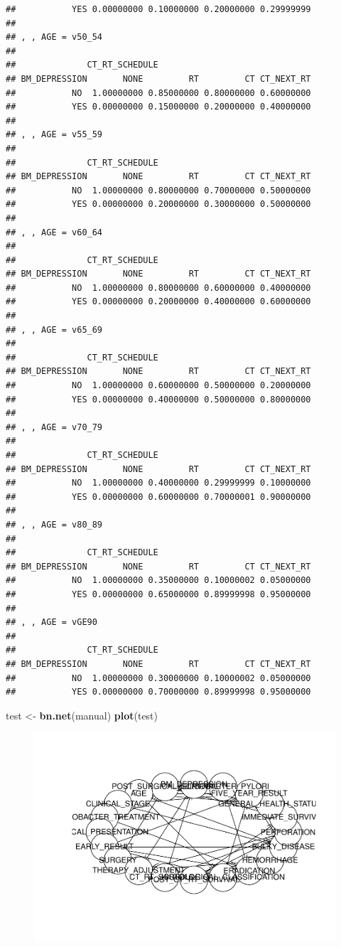 \documentclass[]{article}
\newenvironment{Shaded}{\begin{snugshade}}{\end{snugshade}}
\newcommand{\KeywordTok}[1]{\textcolor[rgb]{0.13,0.29,0.53}{\textbf{{#1}}}}
\newcommand{\StringTok}[1]{\textcolor[rgb]{0.31,0.60,0.02}{{#1}}}
\newcommand{\NormalTok}[1]{{#1}}
\begin{document}
\begin{verbatim}
##           YES 0.00000000 0.10000000 0.20000000 0.29999999
## 
## , , AGE = v50_54
## 
##              CT_RT_SCHEDULE
## BM_DEPRESSION       NONE         RT         CT CT_NEXT_RT
##           NO  1.00000000 0.85000000 0.80000000 0.60000000
##           YES 0.00000000 0.15000000 0.20000000 0.40000000
## 
## , , AGE = v55_59
## 
##              CT_RT_SCHEDULE
## BM_DEPRESSION       NONE         RT         CT CT_NEXT_RT
##           NO  1.00000000 0.80000000 0.70000000 0.50000000
##           YES 0.00000000 0.20000000 0.30000000 0.50000000
## 
## , , AGE = v60_64
## 
##              CT_RT_SCHEDULE
## BM_DEPRESSION       NONE         RT         CT CT_NEXT_RT
##           NO  1.00000000 0.80000000 0.60000000 0.40000000
##           YES 0.00000000 0.20000000 0.40000000 0.60000000
## 
## , , AGE = v65_69
## 
##              CT_RT_SCHEDULE
## BM_DEPRESSION       NONE         RT         CT CT_NEXT_RT
##           NO  1.00000000 0.60000000 0.50000000 0.20000000
##           YES 0.00000000 0.40000000 0.50000000 0.80000000
## 
## , , AGE = v70_79
## 
##              CT_RT_SCHEDULE
## BM_DEPRESSION       NONE         RT         CT CT_NEXT_RT
##           NO  1.00000000 0.40000000 0.29999999 0.10000000
##           YES 0.00000000 0.60000000 0.70000001 0.90000000
## 
## , , AGE = v80_89
## 
##              CT_RT_SCHEDULE
## BM_DEPRESSION       NONE         RT         CT CT_NEXT_RT
##           NO  1.00000000 0.35000000 0.10000002 0.05000000
##           YES 0.00000000 0.65000000 0.89999998 0.95000000
## 
## , , AGE = vGE90
## 
##              CT_RT_SCHEDULE
## BM_DEPRESSION       NONE         RT         CT CT_NEXT_RT
##           NO  1.00000000 0.30000000 0.10000002 0.05000000
##           YES 0.00000000 0.70000000 0.89999998 0.95000000
\end{verbatim}

\begin{Shaded}
\begin{Highlighting}[]
\NormalTok{test <-}\StringTok{ }\KeywordTok{bn.net}\NormalTok{(manual)}
\KeywordTok{plot}\NormalTok{(test)}
\end{Highlighting}
\end{Shaded}

\begin{figure}[htbp]
\centering
\includegraphics{BN_Ass2_files/figure-latex/unnamed-chunk-7-1.pdf}
\end{figure}
\end{document}
